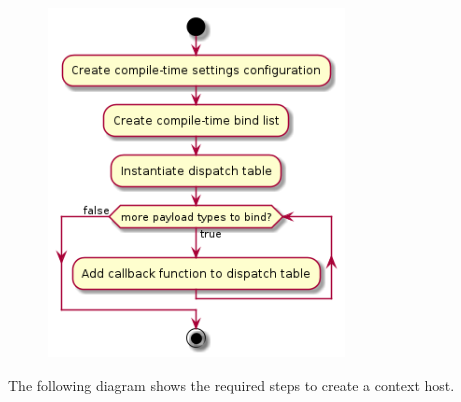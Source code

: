 \documentclass[11pt]{report}
\newcommand{\+}{\discretionary{\mbox{\scriptsize$\hookleftarrow$}}{}{}}
\begin{document}
                \begin{figure}[H]
                \centering
                \includegraphics[width=0.7\textwidth]{d/ac/disptable.png}
                \end{figure}





\newpage
                The following diagram shows the required steps to create a context host.
\end{document}

